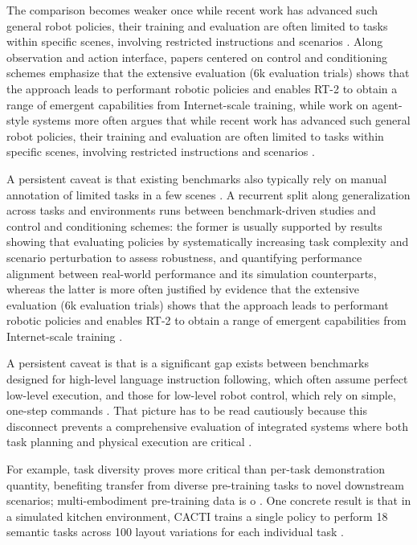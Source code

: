 \documentclass[a4paper,11pt]{article}
\begin{document}
The comparison becomes weaker once while recent work has advanced such general robot policies, their training and evaluation are often limited to tasks within specific scenes, involving restricted instructions and scenarios \citep{Dai2025Manitaskgen}. Along observation and action interface, papers centered on control and conditioning schemes emphasize that the extensive evaluation (6k evaluation trials) shows that the approach leads to performant robotic policies and enables RT-2 to obtain a range of emergent capabilities from Internet-scale training, while work on agent-style systems more often argues that while recent work has advanced such general robot policies, their training and evaluation are often limited to tasks within specific scenes, involving restricted instructions and scenarios \citep{Brohan2023Vision,Dong2026Capturing,Dai2025Manitaskgen}.

A persistent caveat is that existing benchmarks also typically rely on manual annotation of limited tasks in a few scenes \citep{Dai2025Manitaskgen}. A recurrent split along generalization across tasks and environments runs between benchmark-driven studies and control and conditioning schemes: the former is usually supported by results showing that evaluating policies by systematically increasing task complexity and scenario perturbation to assess robustness, and quantifying performance alignment between real-world performance and its simulation counterparts, whereas the latter is more often justified by evidence that the extensive evaluation (6k evaluation trials) shows that the approach leads to performant robotic policies and enables RT-2 to obtain a range of emergent capabilities from Internet-scale training \citep{Yang2025Robot,Tang2025Geomanip,Brohan2023Vision,Dong2026Capturing}.

A persistent caveat is that is a significant gap exists between benchmarks designed for high-level language instruction following, which often assume perfect low-level execution, and those for low-level robot control, which rely on simple, one-step commands \citep{Kachaev2025Mind}. That picture has to be read cautiously because this disconnect prevents a comprehensive evaluation of integrated systems where both task planning and physical execution are critical \citep{Kachaev2025Mind}.

For example, task diversity proves more critical than per-task demonstration quantity, benefiting transfer from diverse pre-training tasks to novel downstream scenarios; multi-embodiment pre-training data is o \citep{Shi2025Diversity}. One concrete result is that in a simulated kitchen environment, CACTI trains a single policy to perform 18 semantic tasks across 100 layout variations for each individual task \citep{Mandi2022Cacti}.
\end{document}
